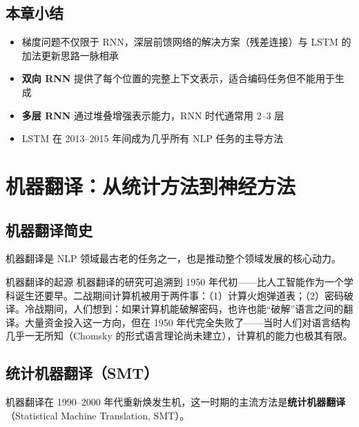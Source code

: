 \documentclass[a4paper]{article}
\begin{document}
\subsection{本章小结}

\begin{itemize}
    \item 梯度问题不仅限于 RNN，深层前馈网络的解决方案（残差连接）与 LSTM 的加法更新思路一脉相承
    \item \textbf{双向 RNN} 提供了每个位置的完整上下文表示，适合编码任务但不能用于生成
    \item \textbf{多层 RNN} 通过堆叠增强表示能力，RNN 时代通常用 2--3 层
    \item LSTM 在 2013--2015 年间成为几乎所有 NLP 任务的主导方法
\end{itemize}


\section{机器翻译：从统计方法到神经方法}

\subsection{机器翻译简史}

机器翻译是 NLP 领域最古老的任务之一，也是推动整个领域发展的核心动力。





\begin{knowledgebox}{机器翻译的起源}
机器翻译的研究可追溯到 1950 年代初——比人工智能作为一个学科诞生还要早。二战期间计算机被用于两件事：（1）计算火炮弹道表；（2）密码破译。冷战期间，人们想到：如果计算机能破解密码，也许也能``破解''语言之间的翻译。大量资金投入这一方向，但在 1950 年代完全失败了——当时人们对语言结构几乎一无所知（Chomsky 的形式语言理论尚未建立），计算机的能力也极其有限。
\end{knowledgebox}

\subsection{统计机器翻译（SMT）}

机器翻译在 1990--2000 年代重新焕发生机，这一时期的主流方法是\textbf{统计机器翻译}（Statistical Machine Translation, SMT）。


\end{document}
